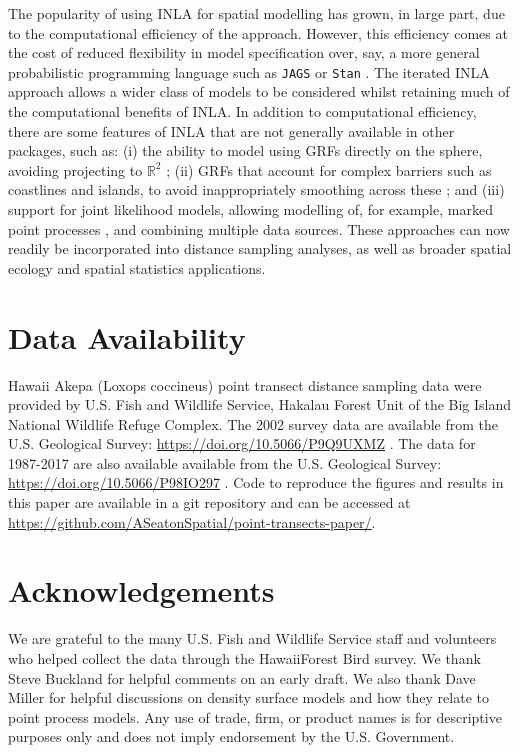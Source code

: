 \documentclass{statsoc}
\newcommand{\hawaii}{Hawai\textquotesingle i}   %
\begin{document}
The popularity of using INLA for spatial modelling has grown, in large part, due to the computational efficiency of the approach.  However, this efficiency comes at the cost of reduced flexibility in model specification over, say, a more general probabilistic programming language such as \texttt{JAGS} \citep{plummer_jags_2017} or \texttt{Stan} \citep{stan_Rstan_2020}.  The iterated INLA approach allows a wider class of models to be considered whilst retaining much of the computational benefits of INLA.  In addition to computational efficiency, there are some features of INLA that are not generally available in other packages, such as: (i) the ability to model using GRFs directly on the sphere, avoiding projecting to $\mathbb{R}^2$ \citep{lindgren_explicit_2011}; (ii) GRFs that account for complex barriers such as coastlines and islands, to avoid inappropriately smoothing across these \citep{bakka_NonstationaryGaussianModels_2019}; and (iii) support for joint likelihood models, allowing modelling of, for example, marked point processes \citep{illian_FittingComplexEcological_2013}, and combining multiple data sources.  These approaches can now readily be incorporated into distance sampling analyses, as well as broader spatial ecology and spatial statistics applications. 

\section*{Data Availability} 

Hawaii Akepa (Loxops coccineus) point transect distance sampling data were provided by U.S. Fish and Wildlife Service, Hakalau Forest Unit of the Big Island National Wildlife Refuge Complex. The 2002 survey data are available from the U.S. Geological Survey: \url{https://doi.org/10.5066/P9Q9UXMZ} \citep{camp_datarelease_2002}.  The data for 1987-2017 are also available  available from the U.S. Geological Survey: \url{https://doi.org/10.5066/P98IO297} \citep{camp_datarelease_all}. Code to reproduce the figures and results in this paper are available in a git repository and can be accessed at \url{https://github.com/ASeatonSpatial/point-transects-paper/}.

\section*{Acknowledgements}

We are grateful to the many U.S. Fish and Wildlife Service staff and volunteers who helped collect the data through the \hawaii Forest Bird survey. We thank Steve Buckland for helpful comments on an early draft.  We also thank Dave Miller for helpful discussions on density surface models and how they relate to point process models.  Any use of trade, firm, or product names is for descriptive purposes only and does not imply endorsement by the U.S. Government.

\clearpage


\end{document}
